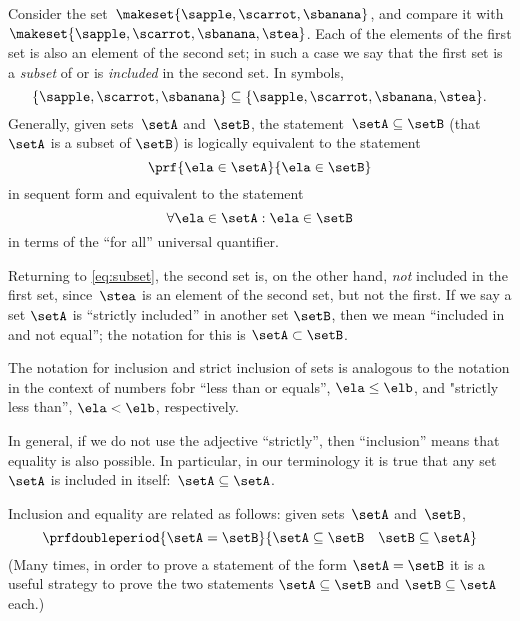 Consider the set~$\makeset{ \sapple, \scarrot, \sbanana }$, and compare it with~$\makeset{ \sapple, \scarrot, \sbanana, \stea }$.
Each of the elements of the first set is also an element of the second set;
in such a case we say that the first set is a \emph{subset} of or is \emph{included} in the second set.
In symbols,
%
\begin{equation}
    \label{eq:subset}
    \{ \sapple, \scarrot, \sbanana \} \subseteq \{ \sapple, \scarrot, \sbanana, \stea \}.
\end{equation}
%
Generally, given sets~$\setA$ and~$\setB$, the statement~$\setA \subseteq \setB$ (that $\setA$ is a subset of $\setB$) is logically equivalent to the statement
%
\begin{equation}
    \prf{
        \ela \in \setA
    }{
        \ela \in \setB
    }
\end{equation}
in sequent form and equivalent to the statement
\begin{equation}\label{eq:inclusion-via-quantifier}
    \forall \ela \in \setA : \ela \in \setB
\end{equation}
in terms of the ``for all'' universal quantifier.

Returning to \cref{eq:subset}, the second set is, on the other hand, \emph{not} included in the first set, since~$\stea$ is an element of the second set, but not the first.
If we say a set $\setA$ is ``strictly included'' in another set $\setB$, then we mean ``included in and not equal''; the notation for this is $\setA \subset \setB$.

The notation for inclusion and strict inclusion of sets is analogous to the notation in the context of numbers fobr ``less than or equals'', $\ela \leq \elb$,  and "strictly less than'', $\ela < \elb$, respectively.

In general, if we do not use the adjective ``strictly'', then ``inclusion'' means that equality is also possible.
In particular, in our terminology it is true that any set~$\setA$ is included in itself:~$\setA \subseteq \setA$.

Inclusion and equality are related as follows: given sets~$\setA$ and~$\setB$,
%
\begin{equation*}
    \prfdoubleperiod{
        \setA = \setB
    }{
        {\setA \subseteq \setB}
        \quad
        {\setB \subseteq \setA}
    }
\end{equation*}
%
(Many times, in order to prove a statement of the form $\setA = \setB$ it is a useful strategy to prove the two statements $\setA \subseteq \setB$ and $\setB \subseteq \setA$ each.)

